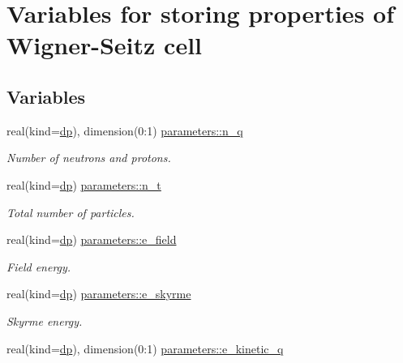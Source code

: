 \hypertarget{group__WS__PROPERTIES}{}\section{Variables for storing properties of Wigner-\/\+Seitz cell}
\label{group__WS__PROPERTIES}
\subsection*{Variables}
\begin{DoxyCompactItemize}
\item 
real(kind=\mbox{\hyperlink{namespaceparameters_a52f8c6351fd79345d8811e065bcbbb37}{dp}}), dimension(0\+:1) \mbox{\hyperlink{group__WS__PROPERTIES_gace169ff7d198e04f282498a2b0ee2bc1}{parameters\+::n\+\_\+q}}
\begin{DoxyCompactList}\small\item\em Number of neutrons and protons. \end{DoxyCompactList}\item 
real(kind=\mbox{\hyperlink{namespaceparameters_a52f8c6351fd79345d8811e065bcbbb37}{dp}}) \mbox{\hyperlink{group__WS__PROPERTIES_ga4ea79549c467085cd4c8b95a09ac205e}{parameters\+::n\+\_\+t}}
\begin{DoxyCompactList}\small\item\em Total number of particles. \end{DoxyCompactList}\item 
real(kind=\mbox{\hyperlink{namespaceparameters_a52f8c6351fd79345d8811e065bcbbb37}{dp}}) \mbox{\hyperlink{group__WS__PROPERTIES_gaba6452c229b473b375ee695573482098}{parameters\+::e\+\_\+field}}
\begin{DoxyCompactList}\small\item\em Field energy. \end{DoxyCompactList}\item 
real(kind=\mbox{\hyperlink{namespaceparameters_a52f8c6351fd79345d8811e065bcbbb37}{dp}}) \mbox{\hyperlink{group__WS__PROPERTIES_ga5683bdc3d77765f0e39d27c0a8c07e12}{parameters\+::e\+\_\+skyrme}}
\begin{DoxyCompactList}\small\item\em Skyrme energy. \end{DoxyCompactList}\item 
real(kind=\mbox{\hyperlink{namespaceparameters_a52f8c6351fd79345d8811e065bcbbb37}{dp}}), dimension(0\+:1) \mbox{\hyperlink{group__WS__PROPERTIES_ga488ae2b962fd84ebc096feb2d9b86bdb}{parameters\+::e\+\_\+kinetic\+\_\+q}}

\end{DoxyCompactItemize}
